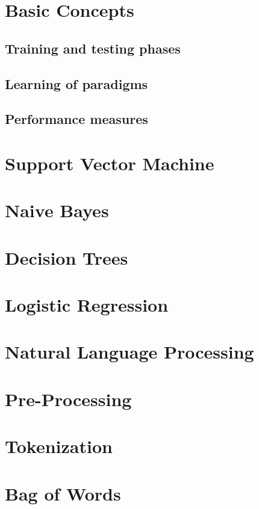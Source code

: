 \section{Basic Concepts}
  \subsection{Training and testing phases}
  \subsection{Learning of paradigms}
  \subsection{Performance measures}

\section{Support Vector Machine}

\section{Naive Bayes}

\section{Decision Trees}

\section{Logistic Regression}

\section{Natural Language Processing}

\section{Pre-Processing}

\section{Tokenization}

\section{Bag of Words}

